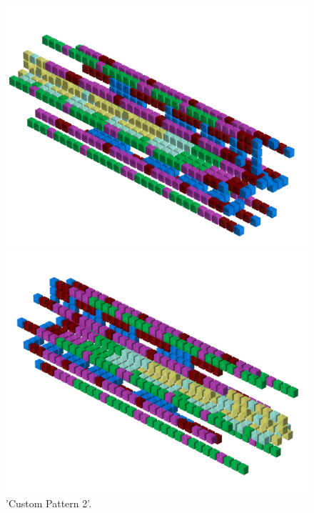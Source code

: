 \begin{figure}[H]
    \centering
    \begin{adjustbox}{width=12cm,center}
      \includegraphics[width=12cm]{src/patterns/pattern9-45.png}%
    \end{adjustbox}
    \begin{adjustbox}{width=12cm,margin=0cm -4cm}
      \includegraphics[width=12cm]{src/patterns/pattern9-225.png}%
    \end{adjustbox}
\caption{'Custom Pattern 2'.}
\end{figure}
\clearpage

